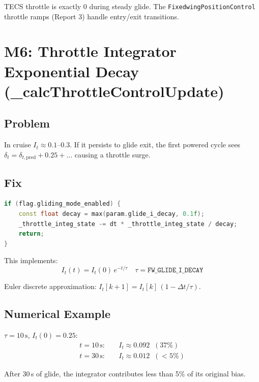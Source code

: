 \documentclass[12pt,a4paper]{article}
\begin{document}
TECS throttle is exactly 0 during steady glide. The
\texttt{FixedwingPositionControl} throttle ramps (Report 3) handle
entry/exit transitions.

\section{M6: Throttle Integrator Exponential Decay (\_calcThrottleControlUpdate)}

\subsection{Problem}

In cruise $I_t \approx 0.1$--$0.3$. If it persists to glide exit, the
first powered cycle sees $\delta_t = \delta_{t,\text{pred}} + 0.25 + \ldots$
causing a throttle surge.

\subsection{Fix}

\begin{lstlisting}[language=C++]
if (flag.gliding_mode_enabled) {
    const float decay = max(param.glide_i_decay, 0.1f);
    _throttle_integ_state -= dt * _throttle_integ_state / decay;
    return;
}
\end{lstlisting}

This implements:
\begin{equation}
  \boxed{I_t(t) = I_t(0)\,e^{-t/\tau}}
  \quad \tau = \texttt{FW\_GLIDE\_I\_DECAY}
\end{equation}

Euler discrete approximation:
$I_t[k+1] = I_t[k]\,(1 - \Delta t/\tau)$.

\subsection{Numerical Example}

$\tau = 10\,\text{s}$, $I_t(0) = 0.25$:
\begin{align}
  t = 10\,\text{s}: &\quad I_t \approx 0.092 \;\;(37\%) \\
  t = 30\,\text{s}: &\quad I_t \approx 0.012 \;\;(<5\%)
\end{align}

After 30\,s of glide, the integrator contributes less than 5\% of its
original bias.
\end{document}
